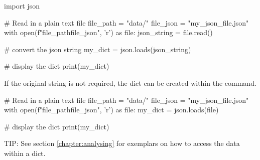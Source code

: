 \begin{pycode}
    import json

    # Read in a plain text file
    file_path = "data/"
    file_json = "my_json_file.json"
    with open(f"{file_path}{file_json}", 'r') as file:
        json_string = file.read()

    # convert the json string
    my_dict = json.loads(json_string)

    # display the dict
    print(my_dict)
\end{pycode}

If the original string is not required, the dict can be created within the  command.

\begin{pycode}
    # Read in a plain text file
    file_path = "data/"
    file_json = "my_json_file.json"
    with open(f"{file_path}{file_json}", 'r') as file:
        my_dict = json.loads(file)

    # display the dict
    print(my_dict)
\end{pycode}

TIP: See section \ref{chapter:analysing} for exemplars on how to access the data within a dict.

